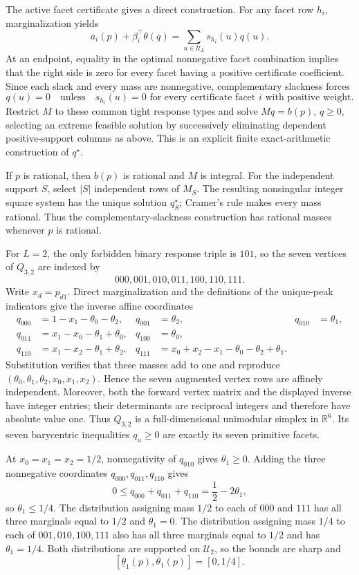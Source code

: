The active facet certificate gives a direct construction.  For any facet row \(h_i\), marginalization yields
\[
 a_i(p)+\beta_i^\top\theta(q)=\sum_{u\in\mathcal U_L}s_{h_i}(u)q(u).
\]
At an endpoint, equality in the optimal nonnegative facet combination implies that the right side is zero for every facet having a positive certificate coefficient.  Since each slack and every mass are nonnegative, complementary slackness forces
\[
 q(u)=0\quad\text{unless}\quad s_{h_i}(u)=0
 \text{ for every certificate facet }i\text{ with positive weight}.
\]
Restrict \(M\) to these common tight response types and solve \(Mq=b(p)\), \(q\ge0\), selecting an extreme feasible solution by successively eliminating dependent positive-support columns as above.  This is an explicit finite exact-arithmetic construction of \(q^\star\).

If \(p\) is rational, then \(b(p)\) is rational and \(M\) is integral.  For the independent support \(S\), select \(|S|\) independent rows of \(M_S\).  The resulting nonsingular integer square system has the unique solution \(q_S^\star\); Cramer's rule makes every mass rational.  Thus the complementary-slackness construction has rational masses whenever \(p\) is rational.

For \(L=2\), the only forbidden binary response triple is \(101\), so the seven vertices of \(Q_{3,2}\) are indexed by
\[
 000,001,010,011,100,110,111.
\]
Write \(x_d=p_{d1}\).  Direct marginalization and the definitions of the unique-peak indicators give the inverse affine coordinates
\[
\begin{aligned}
 q_{000}&=1-x_1-\theta_0-\theta_2,&q_{001}&=\theta_2,&q_{010}&=\theta_1,\\
 q_{011}&=x_1-x_0-\theta_1+\theta_0,&q_{100}&=\theta_0,\\
 q_{110}&=x_1-x_2-\theta_1+\theta_2,&
 q_{111}&=x_0+x_2-x_1-\theta_0-\theta_2+\theta_1.
\end{aligned}
\]
Substitution verifies that these masses add to one and reproduce \((\theta_0,\theta_1,\theta_2,x_0,x_1,x_2)\).  Hence the seven augmented vertex rows are affinely independent.  Moreover, both the forward vertex matrix and the displayed inverse have integer entries; their determinants are reciprocal integers and therefore have absolute value one.  Thus \(Q_{3,2}\) is a full-dimensional unimodular simplex in \(\mathbb R^6\).  Its seven barycentric inequalities \(q_u\ge0\) are exactly its seven primitive facets.

At \(x_0=x_1=x_2=1/2\), nonnegativity of \(q_{010}\) gives \(\theta_1\ge0\).  Adding the three nonnegative coordinates \(q_{000},q_{011},q_{110}\) gives
\[
 0\le q_{000}+q_{011}+q_{110}
   =\frac12-2\theta_1,
\]
so \(\theta_1\le1/4\).  The distribution assigning mass \(1/2\) to each of \(000\) and \(111\) has all three marginals equal to \(1/2\) and \(\theta_1=0\).  The distribution assigning mass \(1/4\) to each of \(001,010,100,111\) also has all three marginals equal to \(1/2\) and has \(\theta_1=1/4\).  Both distributions are supported on \(\mathcal U_2\), so the bounds are sharp and
\[
 [\underline\theta_1(p),\overline\theta_1(p)]=[0,1/4].
\]

